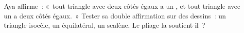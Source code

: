 \begin{exercise}[$\star\star$]\label{exo:g4:symmetry:11}
Aya affirme~: «~tout triangle avec deux côtés égaux a un , et tout triangle avec un  a deux côtés
égaux.~» Tester sa double affirmation sur des dessins~: un triangle
isocèle, un équilatéral, un scalène. Le pliage la soutient-il~?
\end{exercise}

